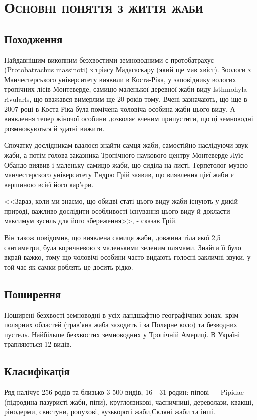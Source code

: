 
\newpage
\chapter{\textsc{Основні\- поняття\- з життя жаби}}

\section{Походження}
Найдавнішим викопним безхвостими земноводними є протобатрахус (Protobatrachus massinoti) з тріасу Мадагаскару (який ще мав хвіст). Зоологи з Манчестерського університету виявили в Коста-Ріка, у заповіднику вологих тропічних лісів Монтеверде, самицю маленької деревної жаби виду Іsthmohyla rіvularіs, що вважався вимерлим ще 20 років тому. Вчені зазначають, що іще в 2007 році в Коста-Ріка була помічена чоловіча особина жаби цього виду. А виявлення тепер жіночої особини дозволяє вченим припустити, що ці земноводні розмножуються й здатні вижити.

Спочатку дослідникам вдалося знайти самця жаби, самостійно наслідуючи звук жаби, а потім голова заказника Тропічного наукового центру Монтеверде Луїс Обандо виявив і маленьку самицю жаби, що сиділа на листі. Герпетолог музею манчестерского університету Ендрю Грій заявив, що виявлення цієї жаби є вершиною всієї його кар'єри.

<<Зараз, коли ми знаємо, що обидві статі цього виду жаби існують у дикій природі, важливо дослідити особливості існування цього виду й докласти максимум зусиль для його збереження>>, - сказав Грій.

Він також повідомив, що виявлена самиця жаби, довжина тіла якої 2,5 сантиметри, була коричневою з маленькими зеленим плямами. Знайти її було вкрай важко, тому що чоловічі особини часто видають голосні закличні звуки, у той час як самки роблять це досить рідко.

\section{Поширення}
Поширені безхвості земноводні в усіх ландшафтно-географічних зонах, крім полярних областей (трав'яна жаба заходить і за Полярне коло) та безводних пустель. Найбільше безхвостих земноводних у Тропічній Америці. В Україні трапляються 12 видів.


\section{Класифікація}
Ряд налічує 256 родів та близько 3 500 видів, 16—31 родин: піпові — Pipidae (підродина пазуристі жаби, піпи), круглоязикові, часничниці, дереволази, квакші, рінодерми, свистуни, ропухові, вузькороті жаби,Скляні жаби та інші.

